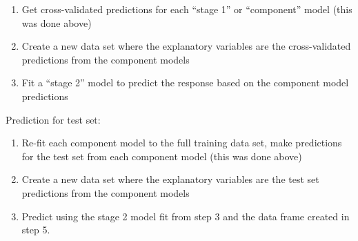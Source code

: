 \documentclass[]{article}
\providecommand{\tightlist}{%
  \setlength{\itemsep}{0pt}\setlength{\parskip}{0pt}}
\begin{document}
\begin{enumerate}
\def\labelenumi{\arabic{enumi}.}
\tightlist
\item
  Get cross-validated predictions for each ``stage 1'' or ``component''
  model (this was done above)
\item
  Create a new data set where the explanatory variables are the
  cross-validated predictions from the component models
\item
  Fit a ``stage 2'' model to predict the response based on the component
  model predictions
\end{enumerate}

Prediction for test set:

\begin{enumerate}
\def\labelenumi{\arabic{enumi}.}
\setcounter{enumi}{3}
\tightlist
\item
  Re-fit each component model to the full training data set, make
  predictions for the test set from each component model (this was done
  above)
\item
  Create a new data set where the explanatory variables are the test set
  predictions from the component models
\item
  Predict using the stage 2 model fit from step 3 and the data frame
  created in step 5.
\end{enumerate}
\end{document}
